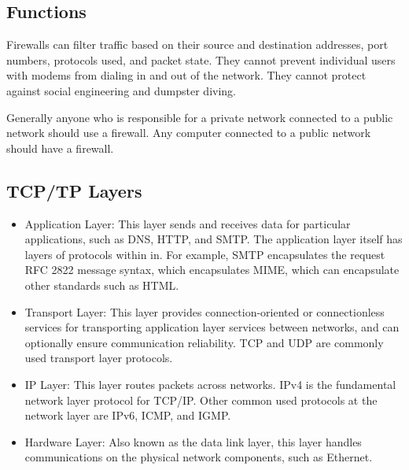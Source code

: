 \documentclass{math}
\begin{document}
\subsection*{Functions}
Firewalls can filter traffic based on their source and destination addresses,
port numbers, protocols used, and packet state. They cannot prevent individual
users with modems from dialing in and out of the network. They cannot protect
against social engineering and dumpster diving. \par
Generally anyone who is responsible for a private network connected to a public
network should use a firewall. Any computer connected to a public network should
have a firewall.

\subsection*{TCP/TP Layers}
\begin{itemize}
  \item Application Layer: This layer sends and receives data for particular
    applications, such as DNS, HTTP, and SMTP. The application layer itself has
    layers of protocols within in. For example, SMTP encapsulates the request
    RFC 2822 message syntax, which encapsulates MIME, which can encapsulate
    other standards such as HTML.
  \item Transport Layer: This layer provides connection-oriented or
    connectionless services for transporting application layer services between
    networks, and can optionally ensure communication reliability. TCP and UDP
    are commonly used transport layer protocols.
  \item IP Layer: This layer routes packets across networks. IPv4 is the
    fundamental network layer protocol for TCP/IP. Other common used protocols
    at the network layer are IPv6, ICMP, and IGMP.
  \item Hardware Layer: Also known as the data link layer, this layer handles
    communications on the physical network components, such as Ethernet.
\end{itemize}
\end{document}
